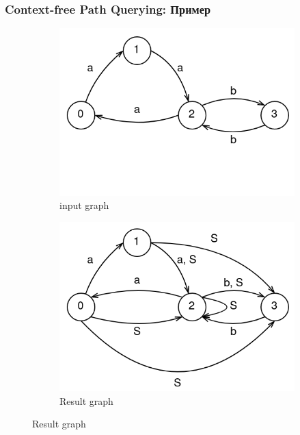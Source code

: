 \documentclass[xcolor=table,english]{beamer}
\begin{document}
\begin{frame}[fragile] \frametitle{Context-free Path Querying: Пример}
    \begin{minipage}[m]{\linewidth}
        \begin{figure}
           \centering
            \begin{subfigure}[b]{0.4\textwidth}
                \includegraphics[width=\textwidth]{figures/graph_cfpq_1.png}
                \caption{input graph}
            \end{subfigure}
            \hfill
            \begin{subfigure}[b]{0.4\textwidth}
                \includegraphics[width=\textwidth]{figures/graph_cfpq_2.png}
                \caption{Result graph}
            \end{subfigure}

\end{figure}
\end{minipage}
\end{frame}
\end{document}
